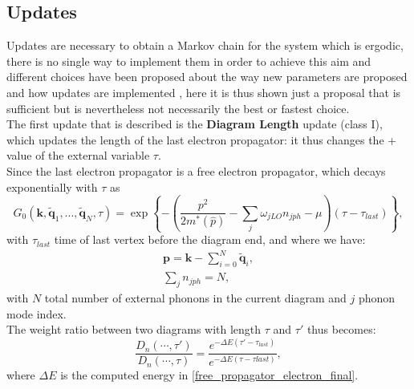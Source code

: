 \subsection{Updates}
Updates are necessary to obtain a Markov chain for the system which is ergodic, there is no single way to implement them in order to 
achieve this aim and different choices have been proposed about the way new parameters are proposed and how updates are implemented 
\cite{mishchenko2000diagrammatic}\cite{hahn2018diagrammatic}, here it is thus shown just a proposal that is sufficient but is nevertheless not 
necessarily the best or fastest choice.\\
The first update that is described is the \textbf{Diagram Length} update (class I), which updates the length of the last electron propagator: it thus changes the +
value of the external variable $\tau$.\\
Since the last electron propagator is a free electron propagator, which decays exponentially with $\tau$ as
\begin{equation}
    G_0(\mathbf{k},\tilde{\mathbf{q}}_1,...,\tilde{\mathbf{q}}_N,\tau)=\exp{ \left\{-\left(\frac{p^2}{2m^*(\hat{p})}-\sum_{j}\omega_{jLO}n_{jph}-\mu \right)(\tau-\tau_{last})\right\}},
    \label{free_propagator_electron_final}
\end{equation}
with $\tau_{last}$ time of last vertex before the diagram end, and where we have:
\begin{equation}
\begin{split}
    \mathbf{p}=\mathbf{k}-\sum_{i=0}^N\tilde{\mathbf{q}}_i,\\
    \sum_j n_{jph}=N,
\end{split}
\end{equation}
with $N$ total number of external phonons in the current diagram and $j$ phonon mode index.\\
The weight ratio between two diagrams with length $\tau$ and $\tau'$ thus becomes:
\begin{equation}
    \frac{D_n(\cdots,\tau')}{D_n(\cdots,\tau)}=\frac{e^{-\Delta E (\tau'-\tau_{last})}}{e^{-\Delta E (\tau-\tau{last})}},
    \label{weights_diagram_length}
\end{equation}
where $\Delta E$ is the computed energy in \ref{free_propagator_electron_final}.
